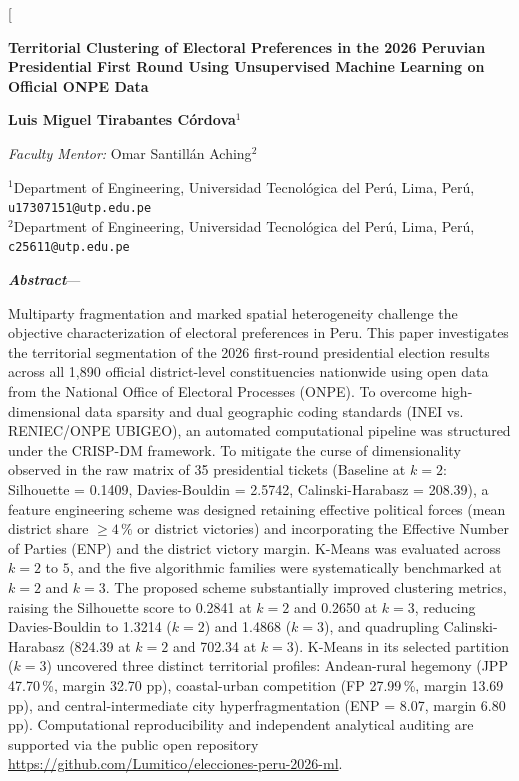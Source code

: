 \documentclass[conference,10pt,letterpaper]{IEEEtran}
\makeatletter
\renewenvironment{abstract}{%
  \normalfont\@IEEEabskeysecsize
  \noindent\textbf{\textit{\abstractname}}---\relax
}{\par\normalfont\normalsize}
\makeatother
\begin{document}
\pagestyle{fancy}

\twocolumn[{%
  \centering
  {\LARGE\bfseries Territorial Clustering of Electoral Preferences in the 2026 Peruvian Presidential First Round Using Unsupervised Machine Learning on Official ONPE Data\par}
  \vspace{1.8ex}
  {\normalsize\bfseries Luis Miguel Tirabantes C\'ordova$^{1}$\par}
  \vspace{0.4ex}
  {\normalsize\textit{Faculty Mentor:} Omar Santill\'an Aching$^{2}$\par}
  \vspace{1.0ex}
  {\footnotesize $^{1}$Department of Engineering, Universidad Tecnológica del Perú, Lima, Perú, \texttt{u17307151@utp.edu.pe}\\
  $^{2}$Department of Engineering, Universidad Tecnológica del Perú, Lima, Perú, \texttt{c25611@utp.edu.pe}\par}
  \vspace{2.4ex}
  \parbox{\textwidth}{%
    \renewcommand\abstractname{Abstract}%
    \renewcommand\IEEEkeywordsname{Keywords}%
    \begin{abstract}
Multiparty fragmentation and marked spatial heterogeneity challenge the objective characterization of electoral preferences in Peru. This paper investigates the territorial segmentation of the 2026 first-round presidential election results across all 1,890 official district-level constituencies nationwide using open data from the National Office of Electoral Processes (ONPE). To overcome high-dimensional data sparsity and dual geographic coding standards (INEI vs. RENIEC/ONPE UBIGEO), an automated computational pipeline was structured under the CRISP-DM framework. To mitigate the curse of dimensionality observed in the raw matrix of 35 presidential tickets (Baseline at $k = 2$: Silhouette = 0.1409, Davies-Bouldin = 2.5742, Calinski-Harabasz = 208.39), a feature engineering scheme was designed retaining effective political forces (mean district share $\ge 4\,\%$ or district victories) and incorporating the Effective Number of Parties (ENP) and the district victory margin. K-Means was evaluated across $k = 2$ to $5$, and the five algorithmic families were systematically benchmarked at $k = 2$ and $k = 3$. The proposed scheme substantially improved clustering metrics, raising the Silhouette score to 0.2841 at $k = 2$ and 0.2650 at $k = 3$, reducing Davies-Bouldin to 1.3214 ($k = 2$) and 1.4868 ($k = 3$), and quadrupling Calinski-Harabasz (824.39 at $k = 2$ and 702.34 at $k = 3$). K-Means in its selected partition ($k = 3$) uncovered three distinct territorial profiles: Andean-rural hegemony (JPP 47.70\,\%, margin 32.70 pp), coastal-urban competition (FP 27.99\,\%, margin 13.69 pp), and central-intermediate city hyperfragmentation (ENP = 8.07, margin 6.80 pp). Computational reproducibility and independent analytical auditing are supported via the public open repository \url{https://github.com/Lumitico/elecciones-peru-2026-ml}.

\end{abstract}}}
\end{document}
